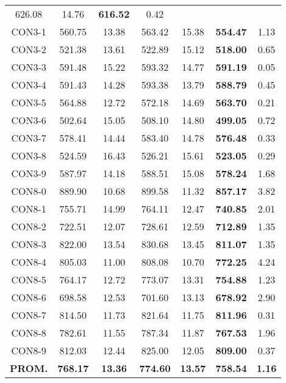 \begin{table}[ht]
\begin{tabular}{c c c c c c c}
626.08 & 14.76 & \bf{616.52} & 
0.42\\CON3-1 & 560.75 & 13.38 & 
563.42 & 15.38 & \bf{554.47} & 
1.13\\CON3-2 & 521.38 & 13.61 & 
522.89 & 15.12 & \bf{518.00} & 
0.65\\CON3-3 & 591.48 & 15.22 & 
593.32 & 14.77 & \bf{591.19} & 
0.05\\CON3-4 & 591.43 & 14.28 & 
593.38 & 13.79 & \bf{588.79} & 
0.45\\CON3-5 & 564.88 & 12.72 & 
572.18 & 14.69 & \bf{563.70} & 
0.21\\CON3-6 & 502.64 & 15.05 & 
508.10 & 14.80 & \bf{499.05} & 
0.72\\CON3-7 & 578.41 & 14.44 & 
583.40 & 14.78 & \bf{576.48} & 
0.33\\CON3-8 & 524.59 & 16.43 & 
526.21 & 15.61 & \bf{523.05} & 
0.29\\CON3-9 & 587.97 & 14.18 & 
588.51 & 15.08 & \bf{578.24} & 
1.68\\CON8-0 & 889.90 & 10.68 & 
899.58 & 11.32 & \bf{857.17} & 
3.82\\CON8-1 & 755.71 & 14.99 & 
764.11 & 12.47 & \bf{740.85} & 
2.01\\CON8-2 & 722.51 & 12.07 & 
728.61 & 12.59 & \bf{712.89} & 
1.35\\CON8-3 & 822.00 & 13.54 & 
830.68 & 13.45 & \bf{811.07} & 
1.35\\CON8-4 & 805.03 & 11.00 & 
808.08 & 10.70 & \bf{772.25} & 
4.24\\CON8-5 & 764.17 & 12.72 & 
773.07 & 13.31 & \bf{754.88} & 
1.23\\CON8-6 & 698.58 & 12.53 & 
701.60 & 13.13 & \bf{678.92} & 
2.90\\CON8-7 & 814.50 & 11.73 & 
821.64 & 11.75 & \bf{811.96} & 
0.31\\CON8-8 & 782.61 & 11.55 & 
787.34 & 11.87 & \bf{767.53} & 
1.96\\CON8-9 & 812.03 & 12.44 & 
825.00 & 12.05 & \bf{809.00} & 
0.37\\\bf{PROM.} & 
\bf{768.17} & \bf{13.36} & \bf{774.60} & \bf{13.57} & \bf{758.54} & \bf{1.16}\\[1ex]\hline
\end{tabular}
\label{table:nonlin}
\end{table} \clearpage
